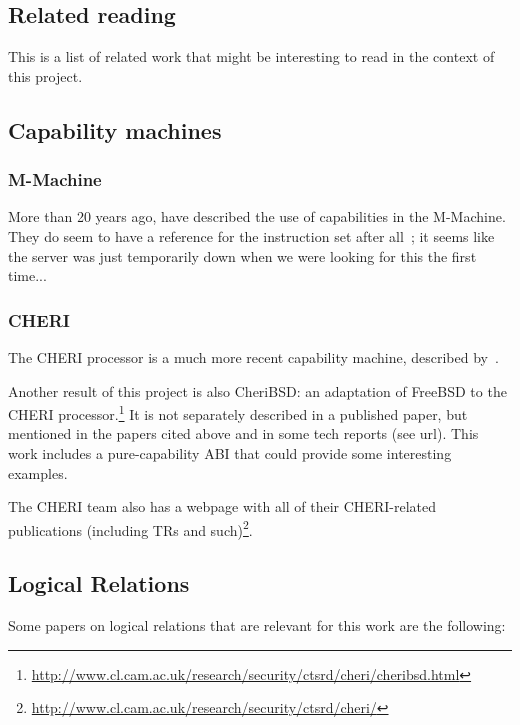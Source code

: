 \documentclass[a4paper]{article}
\begin{document}
\begin{lemma}
\section{Related reading}
\label{sec:related-reading}

This is a list of related work that might be interesting to read in the context
of this project.

\subsection{Capability machines}
\label{sec:rw-cap-machines}

\subsubsection{M-Machine}
More than 20 years ago, \cite{Carter:1994:HSF:195473.195579} have described the
use of capabilities in the M-Machine. They do seem to have a reference for the
instruction set after all~\citep{Dally1997Memo59}; it seems like the server was
just temporarily down when we were looking for this the first time...

\subsubsection{CHERI}

The CHERI processor is a much more recent capability machine, described
by~\cite{Woodruff:2014:CCM:2665671.2665740,Watson2015Cheri}.

Another result of this project is also CheriBSD: an adaptation of FreeBSD to the
CHERI
processor.\footnote{\url{http://www.cl.cam.ac.uk/research/security/ctsrd/cheri/cheribsd.html}}
It is not separately described in a published paper, but mentioned in the papers
cited above and in some tech reports (see url). This work includes a
pure-capability ABI that could provide some interesting examples.

The CHERI team also has a webpage with all of their CHERI-related publications
(including TRs and
such)\footnote{\url{http://www.cl.cam.ac.uk/research/security/ctsrd/cheri/}}.

\subsection{Logical Relations}
\label{sec:rw-log-rel}

Some papers on logical relations that are relevant for this work are the
following:


\end{lemma}
\end{document}
